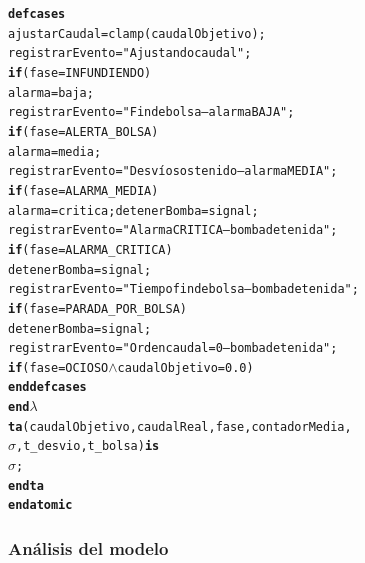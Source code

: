 \documentclass[12pt,a4paper]{article}
\newcommand{\cmlwedge}{$\wedge$}
\newcommand{\kw}[1]{\textbf{#1}}
\newcommand{\cmlsigma}{$\sigma$}
\newcommand{\clambda}{$\lambda$}
\newcommand{\cmlta}{\textbf{ta}}
\newenvironment{cmldevs}{%
  \begin{alltt}\small%
}{%
  \end{alltt}%
}
\begin{document}
\begin{center}
\begin{cmldevs}
    \kw{defcases}
        ajustarCaudal = clamp(caudalObjetivo);
        registrarEvento = "Ajustando caudal";
            \kw{if} (fase = INFUNDIENDO)
        alarma = baja;
        registrarEvento = "Fin de bolsa -- alarma BAJA";
            \kw{if} (fase = ALERTA\_BOLSA)
        alarma = media;
        registrarEvento = "Desvío sostenido -- alarma MEDIA";
            \kw{if} (fase = ALARMA\_MEDIA)
        alarma = critica; detenerBomba = signal;
        registrarEvento = "Alarma CRITICA -- bomba detenida";
            \kw{if} (fase = ALARMA\_CRITICA)
        detenerBomba = signal;
        registrarEvento = "Tiempo fin de bolsa -- bomba detenida";
            \kw{if} (fase = PARADA\_POR\_BOLSA)
        detenerBomba = signal;
        registrarEvento = "Orden caudal=0 -- bomba detenida";
            \kw{if} (fase = OCIOSO \cmlwedge{} caudalObjetivo = 0.0)
    \kw{end defcases}
\kw{end} \clambda{}
\cmlta{}(caudalObjetivo, caudalReal, fase, contadorMedia,
         \cmlsigma{}, t\_desvio, t\_bolsa) \kw{is}
    \cmlsigma{};
\kw{end} \cmlta{}
\kw{end atomic}
\end{cmldevs}
\label{fig:controlador-bomba}
\end{center}

\subsubsection*{Análisis del modelo}
\end{document}
